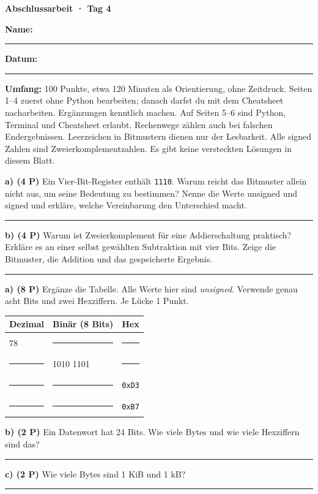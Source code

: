 \documentclass[10pt,a4paper]{article}
\newcommand{\titlepagepart}[2]{\vspace*{-4mm}{\sffamily\small #1}\par{\sffamily\LARGE\bfseries #2}\par\vspace{2mm}}
\newcommand{\block}[1]{\par\vspace{2mm}{\sffamily\large\bfseries #1}\par}
\newcommand{\code}[1]{\texttt{#1}}
\newcommand{\antwort}[1]{\par\vspace{#1}\hrule\vspace{2mm}}
\newcommand{\aufgabe}[2]{\block{#1 \hfill #2 Punkte}}
\begin{document}
\titlepagepart{01 / VERSTEHEN UND UMRECHNEN}{Abschlussarbeit · Tag 4}
\textbf{Name:} \rule{65mm}{0.3pt}\hfill\textbf{Datum:} \rule{30mm}{0.3pt}

\textbf{Umfang:} 100 Punkte, etwa 120 Minuten als Orientierung, ohne Zeitdruck.
Seiten 1--4 zuerst ohne Python bearbeiten; danach darfst du mit dem Cheatsheet
nacharbeiten. Ergänzungen kenntlich machen. Auf Seiten 5--6 sind Python,
Terminal und Cheatsheet erlaubt. Rechenwege zählen auch bei falschen Endergebnissen.
Leerzeichen in Bitmustern dienen nur der Lesbarkeit. Alle signed Zahlen sind
Zweierkomplementzahlen. Es gibt keine versteckten Lösungen in diesem Blatt.

\aufgabe{1. Das Warum erklären}{8}
\textbf{a) (4 P)} Ein Vier-Bit-Register enthält \code{1110}. Warum reicht das
Bitmuster allein nicht aus, um seine Bedeutung zu bestimmen? Nenne die Werte
unsigned und signed und erkläre, welche Vereinbarung den Unterschied macht.
\antwort{22mm}
\textbf{b) (4 P)} Warum ist Zweierkomplement für eine Addierschaltung praktisch?
Erkläre es an einer selbst gewählten Subtraktion mit vier Bits. Zeige die
Bitmuster, die Addition und das gespeicherte Ergebnis.
\antwort{27mm}

\aufgabe{2. Zahlensysteme und Einheiten}{12}
\textbf{a) (8 P)} Ergänze die Tabelle. Alle Werte hier sind \emph{unsigned}.
Verwende genau acht Bits und zwei Hexziffern. Je Lücke 1 Punkt.
\begin{center}
\begin{tabular}{p{35mm}p{55mm}p{35mm}}\toprule
Dezimal&Binär (8 Bits)&Hex\\\midrule
78&\rule{43mm}{0.2pt}&\rule{25mm}{0.2pt}\\[4mm]
\rule{25mm}{0.2pt}&1010 1101&\rule{25mm}{0.2pt}\\[4mm]
\rule{25mm}{0.2pt}&\rule{43mm}{0.2pt}&\code{0xD3}\\[4mm]
\rule{25mm}{0.2pt}&\rule{43mm}{0.2pt}&\code{0xB7}\\\bottomrule
\end{tabular}
\end{center}
\textbf{b) (2 P)} Ein Datenwort hat 24 Bits. Wie viele Bytes und wie viele
Hexziffern sind das?\antwort{8mm}
\textbf{c) (2 P)} Wie viele Bytes sind 1 KiB und 1 kB?\antwort{8mm}
\end{document}
